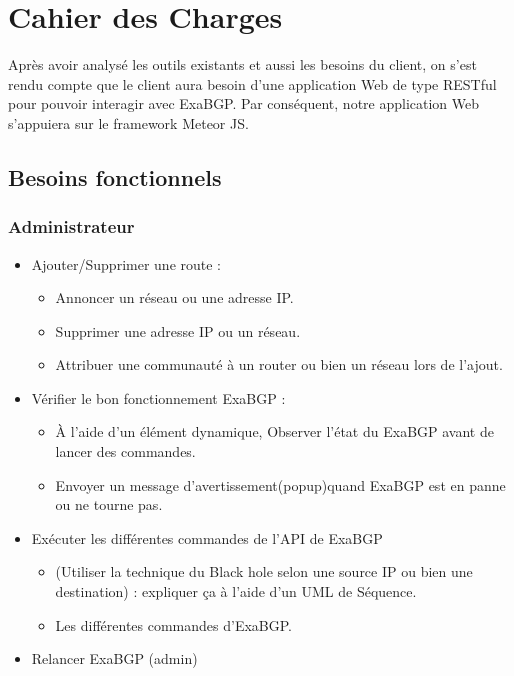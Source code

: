 \section{Cahier des Charges}
Après avoir analysé les outils existants et aussi les besoins du client, on s'est rendu compte que le client aura besoin d'une application Web de type RESTful pour pouvoir interagir avec ExaBGP.
\newline
Par conséquent, notre application Web s'appuiera sur le framework Meteor JS. 

\subsection{Besoins fonctionnels}

\subsubsection{Administrateur}
\begin{itemize}
\item Ajouter/Supprimer une route : 
	\begin{itemize}
		\item Annoncer un réseau ou une adresse IP.
        \item Supprimer une adresse IP ou un réseau.
        \item Attribuer une communauté à un router ou bien un réseau lors de l'ajout.
	\end{itemize}
    
\item Vérifier le bon fonctionnement ExaBGP :
	\begin{itemize}
		\item À l'aide d'un élément dynamique, Observer l'état du ExaBGP avant de lancer des commandes.
        \item Envoyer un message d'avertissement(popup)quand ExaBGP est en panne ou ne tourne pas.
	\end{itemize}
    
\item Exécuter les différentes commandes de l'API de ExaBGP
	\begin{itemize}
		\item (Utiliser la technique du Black hole selon une source IP ou bien une destination) : expliquer ça à l'aide d'un UML de Séquence.
        \item Les différentes commandes d'ExaBGP.
	\end{itemize}	

\item Relancer ExaBGP (admin)
\end{itemize}

